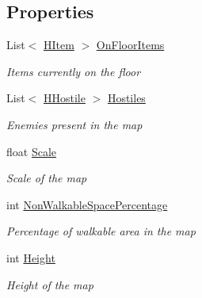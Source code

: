 \subsection*{Properties}
\begin{DoxyCompactItemize}
\item 
List$<$ \hyperlink{class_hel_project_1_1_game_world_1_1_h_item}{H\+Item} $>$ \hyperlink{class_hel_project_1_1_game_world_1_1_map_1_1_h_map_a4da83fe2eddc89c152e737b682068f57}{On\+Floor\+Items}
\begin{DoxyCompactList}\small\item\em Items currently on the floor \end{DoxyCompactList}\item 
List$<$ \hyperlink{class_hel_project_1_1_game_world_1_1_entities_1_1_h_hostile}{H\+Hostile} $>$ \hyperlink{class_hel_project_1_1_game_world_1_1_map_1_1_h_map_a282de8bad37c11eecbfeffa2243addf4}{Hostiles}
\begin{DoxyCompactList}\small\item\em Enemies present in the map \end{DoxyCompactList}\item 
float \hyperlink{class_hel_project_1_1_game_world_1_1_map_1_1_h_map_a023973ffc8b857d992378e235632021c}{Scale}
\begin{DoxyCompactList}\small\item\em Scale of the map \end{DoxyCompactList}\item 
int \hyperlink{class_hel_project_1_1_game_world_1_1_map_1_1_h_map_aa4a0c49d61c84b21d2a40745843b20df}{Non\+Walkable\+Space\+Percentage}
\begin{DoxyCompactList}\small\item\em Percentage of walkable area in the map \end{DoxyCompactList}\item 
int \hyperlink{class_hel_project_1_1_game_world_1_1_map_1_1_h_map_aeb6bb95a8fa7aebc3aaacc656ec70a76}{Height}
\begin{DoxyCompactList}\small\item\em Height of the map \end{DoxyCompactList}\item 

\end{DoxyCompactItemize}
